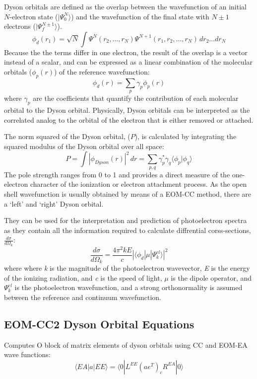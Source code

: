 Dyson orbitals are defined as the overlap between the wavefunction of an initial $N$-electron state ($|\Psi_0^N\rangle$) and the wavefunction of the final state with $N\pm1$ electrons ($|\Psi_f^{N\pm1}\rangle$).
\begin{equation}
    \phi_{d}(r_1) = \sqrt{N} \int \Psi^{N}(r_2,\dots,r_N) \Psi^{N+1}(r_1, r_2,\dots,r_N)\,dr_2 \dots dr_N
\end{equation}
Because the the terms differ in one electron, the result of the overlap is a vector instead of a scalar, and can be expressed as a linear combination of the molecular orbitals ($\phi_p(r)$) of the reference wavefunction:
\begin{equation}
    \phi_{d}(r) = \sum_p \gamma_p \phi_p(r)
\end{equation}
where $\gamma_p$ are the coefficients that quantify the contribution of each molecular orbital to the Dyson orbital. Physically, Dyson orbitals can be interpreted as the correlated analog to the orbital of the electron that is either removed or attached.

The norm squared of the Dyson orbital, ($P$), is calculated by integrating the squared modulus of the Dyson orbital over all space:
\begin{equation}
    P = \int |\phi_{Dyson}(r)|^2 \,dr = \sum_{p,q} \gamma_p^* \gamma_q \langle \phi_p | \phi_q \rangle
\end{equation}
The pole strength ranges from 0 to 1 and provides a direct measure of the one-electron character of the ionization or electron attachment process. As the open shell wavefunction is usually obtained by means of a EOM-CC method, there are a `left' and `right' Dyson orbital.


They can be used for the interpretation and prediction of photoelectron spectra as they contain all the information required to calculate diffrential corss-sections, $\frac{d\sigma}{d\Omega_k}$:
\begin{equation}
    \frac{d\sigma}{d\Omega_k} = \frac{4\pi^2kE}{c}|\langle \phi_d | \mu | \Psi^{el}_k \rangle |^2
\end{equation}
where where \textit{k} is the magnitude of the photoelectron wavevector, \textit{E} is the energy of the ionizing radiation, and \textit{c} is the speed of light, $\mu$ is the dipole operator, and $\Psi^{el}_k$ is the photoelectron wavefunction, and a strong orthonormality is assumed between the reference and continuum wavefunction.  

\subsection{EOM-CC2 Dyson Orbital Equations}
Computes O block of matrix elements of dyson orbitals using CC and EOM-EA wave functions:
\[
               \langle EA|a|EE \rangle = 
        \langle 0|L^{EE}(a e^T)_{c}R^{EA} | 0 \rangle
\]

